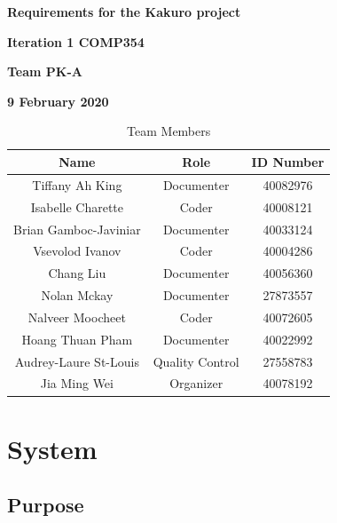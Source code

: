 \documentclass[12pt]{article}
\begin{document}
\vspace*{0.5in}
\centerline{\bf\Large
Requirements for the Kakuro project}

\vspace*{0.5in}
\centerline{\bf\Large Iteration 1 COMP354}

\vspace*{0.5in}
\centerline{\bf\Large Team PK-A}

\vspace*{0.5in}
\centerline{\bf\Large 9 February 2020}

\vspace*{1.5in}
\begin{table}[htbp]
\caption{Team Members}
\begin{center}
\begin{tabular}{|c |c | c|}
\hline
Name & Role & ID Number \\
\hline\hline
Tiffany Ah King & Documenter & 40082976 \\
\hline
Isabelle Charette & Coder & 40008121 \\
\hline
Brian Gamboc-Javiniar & Documenter & 40033124 \\
\hline
Vsevolod Ivanov & Coder & 40004286 \\
\hline
Chang Liu & Documenter & 40056360 \\
\hline
Nolan Mckay & Documenter & 27873557 \\
\hline
Nalveer Moocheet & Coder & 40072605 \\
\hline
Hoang Thuan Pham & Documenter & 40022992 \\
\hline
Audrey-Laure St-Louis & Quality Control & 27558783 \\
\hline
Jia Ming Wei & Organizer & 40078192 \\
\hline
\end{tabular}
\end{center}
\end{table}


\newpage

\renewcommand*\contentsname{Table of Contents}

\tableofcontents

\newpage
\section{System}

\subsection{Purpose}
\end{document}
